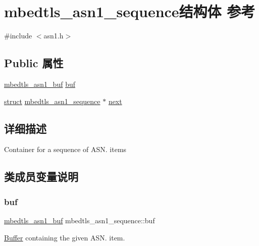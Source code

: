 \hypertarget{structmbedtls__asn1__sequence}{}\section{mbedtls\+\_\+asn1\+\_\+sequence结构体 参考}
\label{structmbedtls__asn1__sequence}


{\ttfamily \#include $<$asn1.\+h$>$}

\subsection*{Public 属性}
\begin{DoxyCompactItemize}
\item 
\hyperlink{structmbedtls__asn1__buf}{mbedtls\+\_\+asn1\+\_\+buf} \hyperlink{structmbedtls__asn1__sequence_a6ef535e31a30926169ee6877af393434}{buf}
\item 
\hyperlink{interfacestruct}{struct} \hyperlink{structmbedtls__asn1__sequence}{mbedtls\+\_\+asn1\+\_\+sequence} $\ast$ \hyperlink{structmbedtls__asn1__sequence_ac81969ddae2ace4340503530588d83e1}{next}
\end{DoxyCompactItemize}


\subsection{详细描述}
Container for a sequence of A\+S\+N. items 

\subsection{类成员变量说明}
\mbox{\label{structmbedtls__asn1__sequence_a6ef535e31a30926169ee6877af393434}} 
\subsubsection{\texorpdfstring{buf}{buf}}
{\footnotesize\ttfamily \hyperlink{structmbedtls__asn1__buf}{mbedtls\+\_\+asn1\+\_\+buf} mbedtls\+\_\+asn1\+\_\+sequence\+::buf}

\hyperlink{class_buffer}{Buffer} containing the given A\+S\+N. item. \mbox{\label{structmbedtls__asn1__sequence_ac81969ddae2ace4340503530588d83e1}} 

